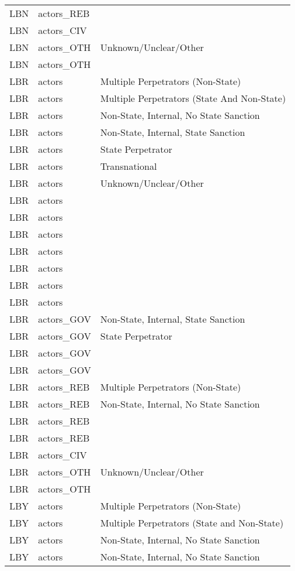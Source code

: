 \begin{table}[ht]
\begin{tabular}{lll}
  LBN & actors\_REB &  \\ 
  LBN & actors\_CIV &  \\ 
  LBN & actors\_OTH & Unknown/Unclear/Other \\ 
  LBN & actors\_OTH &  \\ 
  LBR & actors & Multiple Perpetrators (Non-State) \\ 
  LBR & actors & Multiple Perpetrators (State And Non-State) \\ 
  LBR & actors & Non-State, Internal, No State Sanction \\ 
  LBR & actors & Non-State, Internal, State Sanction \\ 
  LBR & actors & State Perpetrator \\ 
  LBR & actors & Transnational \\ 
  LBR & actors & Unknown/Unclear/Other \\ 
  LBR & actors &  \\ 
  LBR & actors &  \\ 
  LBR & actors &  \\ 
  LBR & actors &  \\ 
  LBR & actors &  \\ 
  LBR & actors &  \\ 
  LBR & actors &  \\ 
  LBR & actors\_GOV & Non-State, Internal, State Sanction \\ 
  LBR & actors\_GOV & State Perpetrator \\ 
  LBR & actors\_GOV &  \\ 
  LBR & actors\_GOV &  \\ 
  LBR & actors\_REB & Multiple Perpetrators (Non-State) \\ 
  LBR & actors\_REB & Non-State, Internal, No State Sanction \\ 
  LBR & actors\_REB &  \\ 
  LBR & actors\_REB &  \\ 
  LBR & actors\_CIV &  \\ 
  LBR & actors\_OTH & Unknown/Unclear/Other \\ 
  LBR & actors\_OTH &  \\ 
  LBY & actors & Multiple Perpetrators (Non-State) \\ 
  LBY & actors & Multiple Perpetrators (State and Non-State) \\ 
  LBY & actors & Non-State, Internal, No State Sanction \\ 
  LBY & actors & Non-State, Internal, No State Sanction \\ 

\end{tabular}
\end{table}
